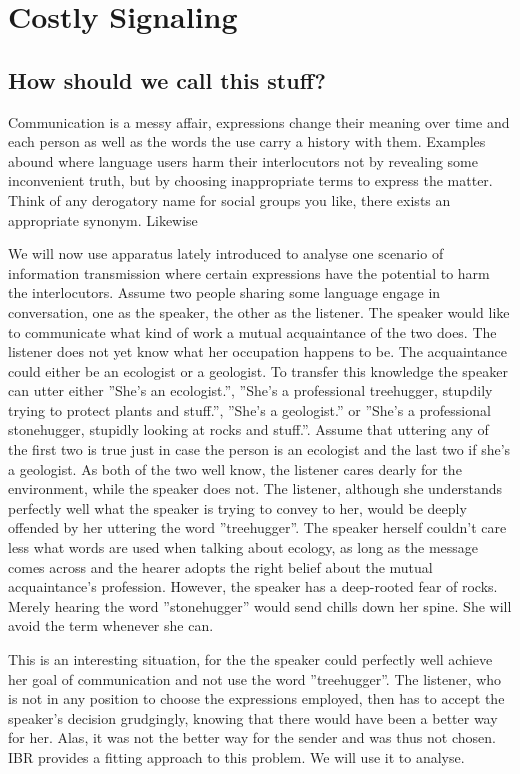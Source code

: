 \documentclass[10]{article}
\begin{document}
\section{Costly Signaling}
\subsection{How should we call this stuff?}
Communication is a messy affair, expressions change their meaning over time and each person as well as the words the use carry a history with them. Examples abound where language users harm their interlocutors not by revealing some inconvenient truth, but by choosing inappropriate terms to express the matter. Think of any derogatory name for social groups you like, there exists an appropriate synonym. Likewise

We will now use apparatus lately introduced to analyse one scenario of information transmission where certain expressions have the potential to harm the interlocutors. Assume two people sharing some language engage in conversation, one as the speaker, the other as the listener. The speaker would like to communicate what kind of work a mutual acquaintance of the two does. The listener does not yet know what her occupation happens to be. The acquaintance could either be an ecologist or a geologist. To transfer this knowledge the speaker can utter either ''She's an ecologist.'', ''She's a professional treehugger, stupdily trying to protect plants and stuff.'', ''She's a geologist.'' or ''She's a professional stonehugger, stupidly looking at rocks and stuff.''. Assume that uttering any of the first two is true just in case the person is an ecologist and the last two if she's a geologist. As both of the two well know, the listener cares dearly for the environment, while the speaker does not. The listener, although she understands perfectly well what the speaker is trying to convey to her, would be deeply offended by her uttering the word ''treehugger''. The speaker herself couldn't care less what words are used when talking about ecology, as long as the message comes across and the hearer adopts the right belief about the mutual acquaintance's profession. However, the speaker has a deep-rooted fear of rocks. Merely hearing the word ''stonehugger'' would send chills down her spine. She will avoid the term whenever she can.

This is an interesting situation, for the the speaker could perfectly well achieve her goal of communication and not use the word ''treehugger''. The listener, who is not in any position to choose the expressions employed, then has to accept the speaker's decision grudgingly, knowing that there would have been a better way for her. Alas, it was not the better way for the sender and was thus not chosen. IBR provides a fitting approach to this problem. We will use it to analyse.
\end{document}
